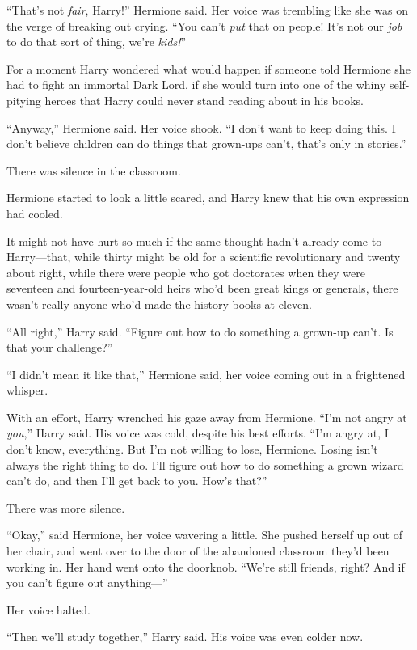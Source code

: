“That’s not \emph{fair}, Harry!” Hermione said. Her voice was trembling like she was on the verge of breaking out crying. “You can’t \emph{put} that on people! It’s not our \emph{job} to do that sort of thing, we’re \emph{kids!}”

For a moment Harry wondered what would happen if someone told Hermione she had to fight an immortal Dark Lord, if she would turn into one of the whiny self-pitying heroes that Harry could never stand reading about in his books.

“Anyway,” Hermione said. Her voice shook. “I don’t want to keep doing this. I don’t believe children can do things that grown-ups can’t, that’s only in stories.”

There was silence in the classroom.

Hermione started to look a little scared, and Harry knew that his own expression had cooled.

It might not have hurt so much if the same thought hadn’t already come to Harry—that, while thirty might be old for a scientific revolutionary and twenty about right, while there were people who got doctorates when they were seventeen and fourteen-year-old heirs who’d been great kings or generals, there wasn’t really anyone who’d made the history books at eleven.

“All right,” Harry said. “Figure out how to do something a grown-up can’t. Is that your challenge?”

“I didn’t mean it like that,” Hermione said, her voice coming out in a frightened whisper.

With an effort, Harry wrenched his gaze away from Hermione. “I’m not angry at \emph{you},” Harry said. His voice was cold, despite his best efforts. “I’m angry at, I don’t know, everything. But I’m not willing to lose, Hermione. Losing isn’t always the right thing to do. I’ll figure out how to do something a grown wizard can’t do, and then I’ll get back to you. How’s that?”

There was more silence.

“Okay,” said Hermione, her voice wavering a little. She pushed herself up out of her chair, and went over to the door of the abandoned classroom they’d been working in. Her hand went onto the doorknob. “We’re still friends, right? And if you can’t figure out anything—”

Her voice halted.

“Then we’ll study together,” Harry said. His voice was even colder now.


